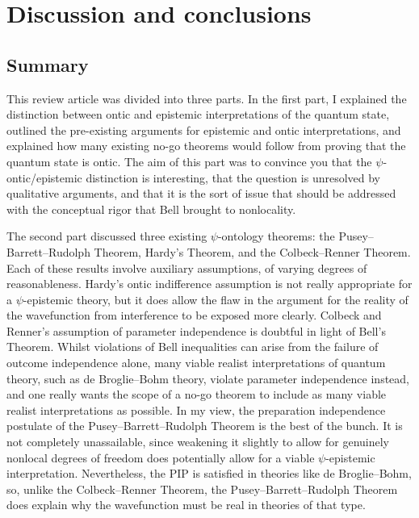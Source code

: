 \documentclass[DIV=calc,paper=a4,fontsize=11pt,twocolumn]{scrartcl} %
\theoremstyle{definition}
\theoremstyle{plain}
\begin{document}
\section{Discussion and conclusions}

\label{Conc}

\subsection{Summary}

This review article was divided into three parts.  In the first part,
I explained the distinction between ontic and epistemic
interpretations of the quantum state, outlined the pre-existing
arguments for epistemic and ontic interpretations, and explained how
many existing no-go theorems would follow from proving that the
quantum state is ontic.  The aim of this part was to convince you that
the $\psi$-ontic/epistemic distinction is interesting, that the
question is unresolved by qualitative arguments, and that it is the
sort of issue that should be addressed with the conceptual rigor that
Bell brought to nonlocality.

The second part discussed three existing $\psi$-ontology theorems: the
Pusey--Barrett--Rudolph Theorem, Hardy's Theorem, and the Colbeck--Renner Theorem.  Each of
these results involve auxiliary assumptions, of varying degrees of
reasonableness.  Hardy's ontic indifference assumption is not really
appropriate for a $\psi$-epistemic theory, but it does allow the flaw
in the argument for the reality of the wavefunction from interference
to be exposed more clearly.  Colbeck and Renner's assumption of
parameter independence is doubtful in light of Bell's Theorem.  Whilst
violations of Bell inequalities can arise from the failure of outcome
independence alone, many viable realist interpretations of quantum
theory, such as de Broglie--Bohm theory, violate parameter independence
instead, and one really wants the scope of a no-go theorem to include
as many viable realist interpretations as possible.  In my view, the
preparation independence postulate of the Pusey--Barrett--Rudolph Theorem is the best of
the bunch.  It is not completely unassailable, since weakening it
slightly to allow for genuinely nonlocal degrees of freedom does
potentially allow for a viable $\psi$-epistemic interpretation.
Nevertheless, the PIP is satisfied in theories like de Broglie--Bohm,
so, unlike the Colbeck--Renner Theorem, the Pusey--Barrett--Rudolph Theorem does explain
why the wavefunction must be real in theories of that type.
\end{document}
